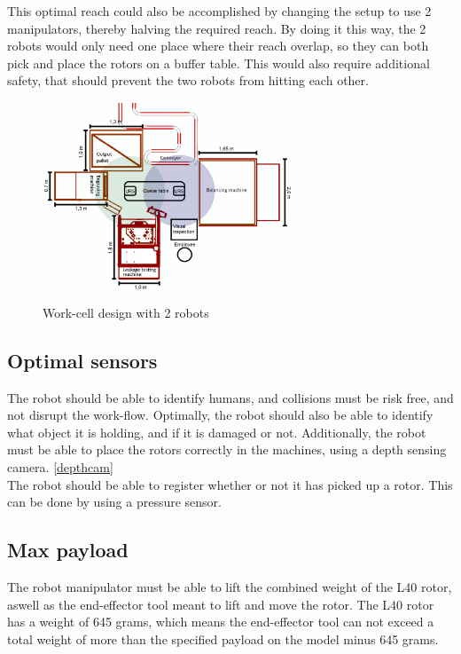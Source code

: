 This optimal reach could also be accomplished by changing the setup to use 2 manipulators, thereby halving the required reach. By doing it this way, the 2 robots would only need one place where their reach overlap, so they can both pick and place the rotors on a buffer table. This would also require additional safety, that should prevent the two robots from hitting each other.\\

\begin{figure}[h]
    \centering
    \includegraphics[width=8cm]{Design/Work_cell_8.PNG}
    \caption{Work-cell design with 2 robots}
    \label{fig:workscell2arms}
\end{figure}



\subsection{Optimal sensors}

The robot should be able to identify humans, and collisions must be risk free, and not disrupt the work-flow. Optimally, the robot should also be able to identify what object it is holding, and if it is damaged or not. Additionally, the robot must be able to place the rotors correctly in the machines, using a depth sensing camera. \ref{depthcam}\\
The robot should be able to register whether or not it has picked up a rotor. This can be done by using a pressure sensor.\\ 

\subsection{Max payload}
The robot manipulator must be able to lift the combined weight of the L40 rotor, aswell as the end-effector tool meant to lift and move the rotor. The L40 rotor has a weight of 645 grams, which means the end-effector tool can not exceed a total weight of more than the specified payload on the model minus 645 grams.

